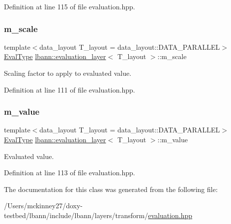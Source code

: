 Definition at line 115 of file evaluation.\+hpp.

\mbox{\label{classlbann_1_1evaluation__layer_af365bda5700dca43434b01f0a2b1ee45}} 
\subsubsection{\texorpdfstring{m\+\_\+scale}{m\_scale}}
{\footnotesize\ttfamily template$<$data\+\_\+layout T\+\_\+layout = data\+\_\+layout\+::\+D\+A\+T\+A\+\_\+\+P\+A\+R\+A\+L\+L\+EL$>$ \\
\hyperlink{base_8hpp_a3266f5ac18504bbadea983c109566867}{Eval\+Type} \hyperlink{classlbann_1_1evaluation__layer}{lbann\+::evaluation\+\_\+layer}$<$ T\+\_\+layout $>$\+::m\+\_\+scale\hspace{0.3cm}{\ttfamily [private]}}

Scaling factor to apply to evaluated value. 

Definition at line 111 of file evaluation.\+hpp.

\mbox{\label{classlbann_1_1evaluation__layer_a0d45f7694e2778f0a0dfb49212f37aef}} 
\subsubsection{\texorpdfstring{m\+\_\+value}{m\_value}}
{\footnotesize\ttfamily template$<$data\+\_\+layout T\+\_\+layout = data\+\_\+layout\+::\+D\+A\+T\+A\+\_\+\+P\+A\+R\+A\+L\+L\+EL$>$ \\
\hyperlink{base_8hpp_a3266f5ac18504bbadea983c109566867}{Eval\+Type} \hyperlink{classlbann_1_1evaluation__layer}{lbann\+::evaluation\+\_\+layer}$<$ T\+\_\+layout $>$\+::m\+\_\+value\hspace{0.3cm}{\ttfamily [private]}}

Evaluated value. 

Definition at line 113 of file evaluation.\+hpp.



The documentation for this class was generated from the following file\+:\begin{DoxyCompactItemize}
\item 
/\+Users/mckinney27/doxy-\/testbed/lbann/include/lbann/layers/transform/\hyperlink{evaluation_8hpp}{evaluation.\+hpp}\end{DoxyCompactItemize}
